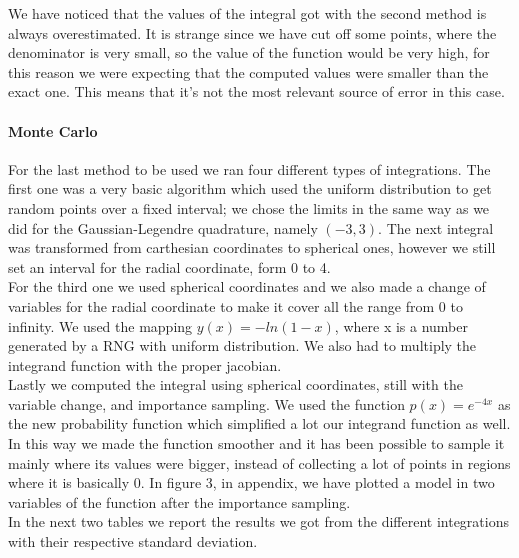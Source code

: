 \documentclass[10pt,a4paper,titlepage]{article}
\begin{document}
We have noticed that the values of the integral got with the second method is always overestimated. 
It is strange since we have cut off some points, where the denominator is very small, so the value of the function would be very high, for this reason we were expecting that the computed values were smaller than the exact one. This means that it's not the most relevant source of error in this case.

\paragraph{Monte Carlo} For the last method to be used we ran four different types of integrations. The first one was a very basic algorithm which used the uniform distribution to get random points over a fixed interval; we chose the limits in the same way as we did for the Gaussian-Legendre quadrature, namely $(-3,3)$. The next integral was transformed from carthesian coordinates to spherical ones, however we still set an interval for the radial coordinate, form 0 to 4.\\ 
For the third one we used spherical coordinates and we also made a change of variables for the radial coordinate to make it cover all the range from 0 to infinity. We used the mapping $y(x)=-ln(1-x)$, where x is a number generated by a RNG with uniform distribution. We also had to multiply the integrand function with the proper jacobian.\\
Lastly we computed the integral using spherical coordinates, still with the variable change,  and importance sampling. We used the function $ p(x) = e^{-4x}$ as the new probability function which simplified a lot our integrand function as well. In this way we made the function smoother and  it has been possible to sample it mainly where its values were bigger, instead of collecting a lot of points in regions where it is basically 0.
In figure 3, in appendix, we have plotted a model in two variables of the function after the importance sampling.\\
In the next two tables we report the results we got from the different integrations with their respective standard deviation.\\
\end{document}
